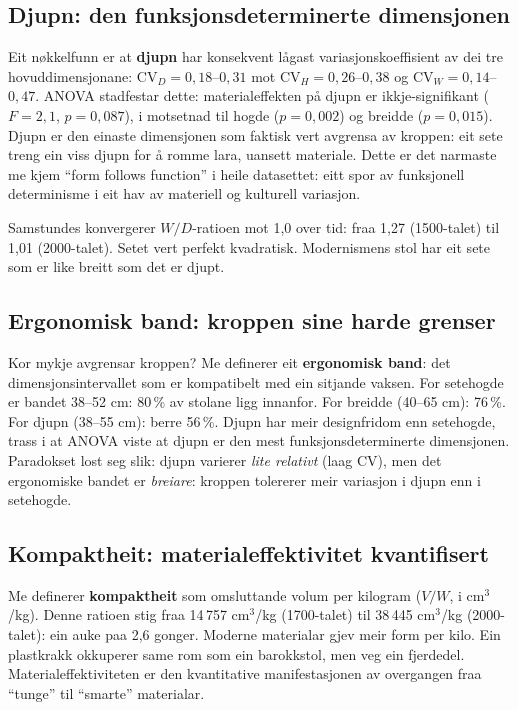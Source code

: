 \documentclass[10pt, a4paper, twocolumn]{article}
\begin{document}
\subsection{Djupn: den funksjonsdeterminerte dimensjonen}

Eit nøkkelfunn er at \textbf{djupn} har konsekvent lågast variasjonskoeffisient av dei tre hovuddimensjonane: $\text{CV}_D = 0{,}18$--$0{,}31$ mot $\text{CV}_H = 0{,}26$--$0{,}38$ og $\text{CV}_W = 0{,}14$--$0{,}47$. ANOVA stadfestar dette: materialeffekten på djupn er ikkje-signifikant ($F = 2{,}1$, $p = 0{,}087$), i motsetnad til hogde ($p = 0{,}002$) og breidde ($p = 0{,}015$). Djupn er den einaste dimensjonen som faktisk vert avgrensa av kroppen: eit sete treng ein viss djupn for å romme lara, uansett materiale. Dette er det narmaste me kjem ``form follows function'' i heile datasettet: eitt spor av funksjonell determinisme i eit hav av materiell og kulturell variasjon.

Samstundes konvergerer $W/D$-ratioen mot 1,0 over tid: fraa 1,27 (1500-talet) til 1,01 (2000-talet). Setet vert perfekt kvadratisk. Modernismens stol har eit sete som er like breitt som det er djupt.

\subsection{Ergonomisk band: kroppen sine harde grenser}

Kor mykje avgrensar kroppen? Me definerer eit \textbf{ergonomisk band}: det dimensjonsintervallet som er kompatibelt med ein sitjande vaksen. For setehogde er bandet 38--52 cm: 80\,\% av stolane ligg innanfor. For breidde (40--65 cm): 76\,\%. For djupn (38--55 cm): berre 56\,\%. Djupn har meir designfridom enn setehogde, trass i at ANOVA viste at djupn er den mest funksjonsdeterminerte dimensjonen. Paradokset lost seg slik: djupn varierer \emph{lite relativt} (laag CV), men det ergonomiske bandet er \emph{breiare}: kroppen tolererer meir variasjon i djupn enn i setehogde.

\subsection{Kompaktheit: materialeffektivitet kvantifisert}

Me definerer \textbf{kompaktheit} som omsluttande volum per kilogram ($V/W$, i cm$^3$/kg). Denne ratioen stig fraa 14\,757 cm$^3$/kg (1700-talet) til 38\,445 cm$^3$/kg (2000-talet): ein auke paa 2,6 gonger. Moderne materialar gjev meir form per kilo. Ein plastkrakk okkuperer same rom som ein barokkstol, men veg ein fjerdedel. Materialeffektiviteten er den kvantitative manifestasjonen av overgangen fraa ``tunge'' til ``smarte'' materialar.
\end{document}
